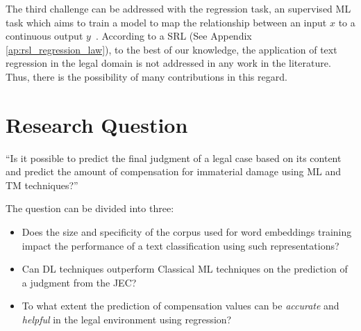 The third challenge can be addressed with the regression task, an supervised \gls{ML} task which aims to train a model to map the relationship between an input $x$ to a continuous output $y$~\cite{Draper1998}. According to a \gls{SRL} (See Appendix \ref{ap:rsl_regression_law}), to the best of our knowledge, the application of text regression in the legal domain is not addressed in any work in the literature. Thus, there is the possibility of many contributions in this regard.



\section{Research Question}

``Is it possible to predict the final judgment of a legal case based on its content and predict the amount of compensation for immaterial damage using \gls{ML} and \gls{TM} techniques?''

The question can be divided into three:

\begin{itemize}[noitemsep]
    \item Does the size and specificity  of the corpus used for word embeddings training impact the performance of a text classification using such representations? 
    
    \item Can \gls{DL} techniques outperform Classical \gls{ML} techniques on the prediction of a judgment from the \gls{JEC}?
    
    \item To what extent the prediction of compensation values can be \emph{accurate} and \emph{helpful} in the legal environment using regression?
\end{itemize}

